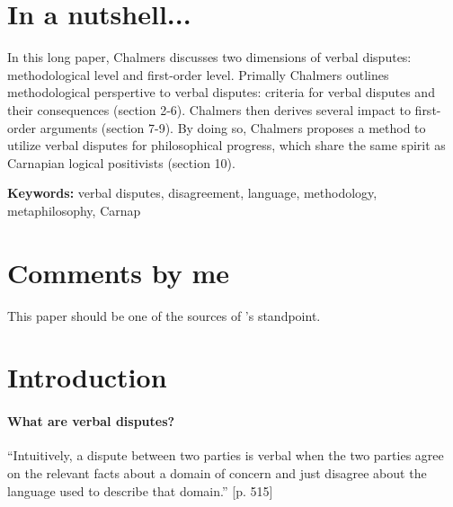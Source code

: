 \documentclass[
10pt, %
a4paper, %
twocolumn, %
landscape %
]{article}
\begin{document}
\pagestyle{myheadings} %
\markright{\doctitle} %


\thispagestyle{plain} %

\printtitle %


\section*{In a nutshell... }
In this long paper,
Chalmers discusses two dimensions of verbal disputes: methodological level and first-order level. Primally Chalmers outlines methodological perspertive to verbal disputes: criteria for verbal disputes and their consequences (section 2-6).
Chalmers then derives several impact to first-order arguments (section 7-9).
By doing so, Chalmers proposes a method to utilize verbal disputes for philosophical progress, which share the same spirit as Carnapian logical positivists (section 10).

\noindent \textbf{Keywords:} verbal disputes, disagreement, language, methodology, metaphilosophy, Carnap

\section*{Comments by me}
This paper should be one of the sources of
\cite{Cappelen2018FixingLanguage}'s standpoint.

\section{Introduction}
\paragraph{What are verbal disputes?}
``Intuitively, a dispute between two parties is verbal when the two parties agree on the relevant facts about a domain of concern and just disagree about the language used to describe that domain.''
[p. 515]
\end{document}
